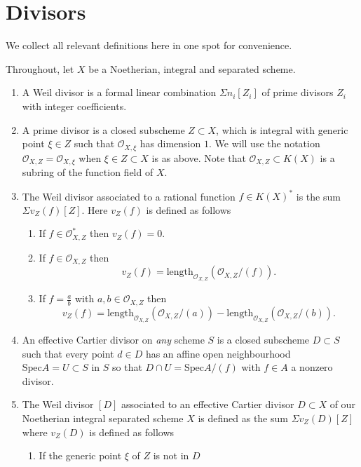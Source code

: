 \section{Divisors}
\label{section-divisors}

\noindent
We collect all relevant definitions here in one spot for convenience.

\begin{definition}
Throughout, let $X$ be a Noetherian, integral and separated scheme.
\begin{enumerate}
\item A Weil divisor is a formal linear combination
$\Sigma n_i[Z_i]$ of prime divisors $Z_i$ with integer coefficients.
\item A prime divisor is a closed subscheme $Z \subset X$,
which is integral with generic point $\xi \in Z$ such that
${\mathcal O}_{X,\xi}$ has dimension $1$. We will use the notation 
${\mathcal O}_{X,Z} = {\mathcal O}_{X,\xi}$
when $\xi \in Z \subset X$ is as above. Note that ${\mathcal O}_{X,Z} \subset
K(X)$ is a subring of the function field of $X$.
\item The Weil divisor associated to a rational function
$f \in K(X)^\ast$ is the sum $\Sigma v_Z(f)[Z]$. Here $v_Z(f)$ is
defined as follows
\begin{enumerate}
\item If $f \in {\mathcal O}_{X,Z}^\ast$ then $v_Z(f)=0$.
\item If $f \in {\mathcal O}_{X,Z}$ then 
$$
v_Z(f)=\text{length}_{{\mathcal O}_{X,Z}}({\mathcal O}_{X,Z}/(f)).
$$
\item If $f = \frac{a}{b}$ with $a,b \in {\mathcal O}_{X,Z}$
then 
$$
v_Z(f)=\text{length}_{{\mathcal O}_{X,Z}}({\mathcal O}_{X,Z}/(a)) -
\text{length}_{{\mathcal O}_{X,Z}}({\mathcal O}_{X,Z}/(b)).
$$
\end{enumerate}
\item An effective Cartier divisor on {\it any} scheme $S$
is a closed subscheme $D \subset S$ such that every point $d\in D$
has an affine open neighbourhood $\text{Spec} A = U \subset S$ in $S$
so that $D \cap U = \text{Spec} A/(f)$ with $f \in A$ a nonzero divisor.
\item The Weil divisor $[D]$ associated to an effective
Cartier divisor $D \subset X$ of our Noetherian integral separated
scheme $X$ is defined as the sum $\Sigma v_Z(D)[Z]$ where
$v_Z(D)$ is defined as follows
\begin{enumerate}
\item If the generic point $\xi$ of $Z$ is not in $D$

\end{enumerate}
\end{enumerate}
\end{definition}
